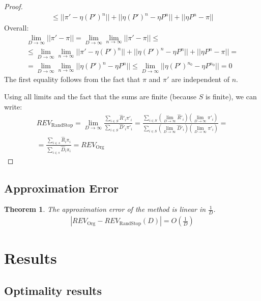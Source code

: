 \documentclass{article}
\newcommand{\revorg}{\textit{REV}_\text{Org}}
\newcommand{\revaux}{\textit{REV}_\text{RandStop}}
\newtheorem{theorem}{Theorem}
\begin{document}
\begin{proof}
\begin{gather*}
        \leq ||\pi' - \eta (P')^n|| + ||\eta (P')^n - \eta P^n|| + ||\eta P^n - \pi||
    \end{gather*}
    Overall:
    \begin{gather*}
        \lim\limits_{D \to \infty} ||\pi' - \pi|| = \lim\limits_{D \to \infty} \lim\limits_{n \to \infty} ||\pi' - \pi|| \leq \\
        \leq \lim\limits_{D \to \infty} \lim\limits_{n \to \infty} ||\pi' - \eta (P')^n|| + ||\eta (P')^n - \eta P^n|| + ||\eta P^n - \pi|| = \\
        = \lim\limits_{D \to \infty} \lim\limits_{n \to \infty} ||\eta (P')^n - \eta P^n|| \leq \lim\limits_{D \to \infty} ||\eta (P')^{n_0} - \eta P^{n_0}|| = 0
    \end{gather*}
    The first equality follows from the fact that $\pi$ and $\pi'$ are independent of $n$.
    
    Using all limits and the fact that the sums are finite (because $S$ is finite), we can write:
    \begin{gather*}
        \revaux = \lim\limits_{D\to\infty} \frac{\sum\limits_{i \in S} \hat{R}'_i \pi'_i}{\sum\limits_{i \in S} \hat{D}'_i \pi'_i} = \frac{\sum\limits_{i \in S} \left( \lim\limits_{D\to\infty} \hat{R}'_i \right) \left( \lim\limits_{D\to\infty} \pi'_i \right)}{\sum\limits_{i \in S} \left( \lim\limits_{D\to\infty} \hat{D}'_i \right) \left( \lim\limits_{D\to\infty} \pi'_i \right)} = \\
        = \frac{\sum\limits_{i \in s} \hat{R}_i \pi_i}{\sum\limits_{i \in s} \hat{D}_i \pi_i} = \revorg
    \end{gather*}
\end{proof}


\subsection{Approximation Error}
\begin{theorem}
    The approximation error of the method is linear in $\frac{1}{D}$.
    \begin{gather*}
        |\revorg -  \revaux(D)| = O(\frac{1}{D})
    \end{gather*}
\end{theorem}


\section{Results}
\subsection{Optimality results}
\end{document}
